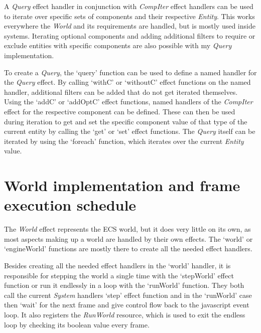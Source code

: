 A \textit{Query} effect handler in conjunction with \textit{CompIter} effect handlers can be used to iterate over specific sets of components and their respective \textit{Entity}. This works everywhere the \textit{World} and its requirements are handled, but is mostly used inside systems. Iterating optional components and adding additional filters to require or exclude entities with specific components are also possible with my \textit{Query} implementation.

To create a \textit{Query}, the `query' function can be used to define a named handler for the \textit{Query} effect. By calling `withC' or `withoutC' effect functions on the named handler, additional filters can be added that do not get iterated themselves. Using the `addC' or `addOptC' effect functions, named handlers of the \textit{CompIter} effect for the respective component can be defined. These can then be used during iteration to get and set the specific component value of that type of the current entity by calling the `get' or `set' effect functions. The \textit{Query} itself can be iterated by using the `foreach' function, which iterates over the current \textit{Entity} value.

\section{World implementation and frame execution schedule}

The \textit{World} effect represents the ECS world, but it does very little on its own, as most aspects making up a world are handled by their own effects. The `world' or `engineWorld' functions are mostly there to create all the needed effect handlers.

Besides creating all the needed effect handlers in the `world' handler, it is responsible for stepping the world a single time with the `stepWorld' effect function or run it endlessly in a loop with the `runWorld' function. They both call the current \textit{System} handlers `step' effect function and in the `runWorld' case then `wait' for the next frame and give control flow back to the javascript event loop. It also registers the \textit{RunWorld} resource, which is used to exit the endless loop by checking its boolean value every frame.
